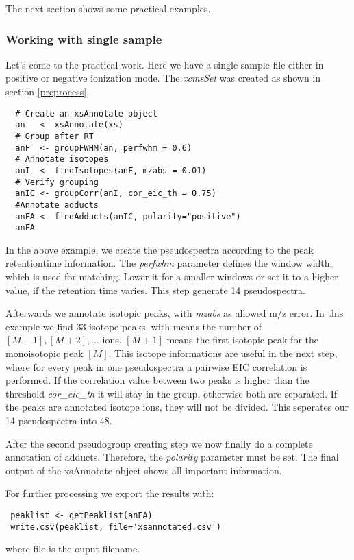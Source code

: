 \documentclass[a4paper,12pt]{article}
\newcommand{\Rclass}[1]{{\textit{#1}}}
\newcommand{\Rfunarg}[1]{{\textit{#1}}}
\begin{document}
The next section shows some practical examples.

\subsubsection{Working with single sample}
Let's come to the practical work. Here we have a single sample file either in
positive or negative ionization mode.
The \Rclass{xcmsSet} was created as shown in section \ref{preprocess}.

\begin{verbatim}
  # Create an xsAnnotate object
  an   <- xsAnnotate(xs)
  # Group after RT
  anF  <- groupFWHM(an, perfwhm = 0.6)
  # Annotate isotopes
  anI  <- findIsotopes(anF, mzabs = 0.01)
  # Verify grouping
  anIC <- groupCorr(anI, cor_eic_th = 0.75)
  #Annotate adducts
  anFA <- findAdducts(anIC, polarity="positive")
  anFA
 \end{verbatim}

In the above example, we create the pseudospectra according to the peak retentiontime
information. The \Rfunarg{perfwhm} parameter defines the window width, which is
used for matching. Lower it for a smaller windows or set it to a higher value,
if the retention time varies. This step generate 14 pseudospectra.

Afterwards we annotate isotopic peaks, with \Rfunarg{mzabs} as allowed m/z
error. In this example we find 33 isotope peaks, with means the number of
$[M+1],[M+2],\ldots$ ions. $[M+1]$ means the first isotopic peak for the monoisotopic
peak $[M]$. This isotope informations are useful in the next step,
where for every peak in one pseudospectra a pairwise EIC correlation is performed. If
the correlation value between two peaks is higher than the threshold
\Rfunarg{cor\_eic\_th} it will stay in the group, otherwise both are separated.
If the peaks are annotated isotope ions, they will not be divided. This seperates
our 14 pseudospectra into 48.

After the second pseudogroup creating step we now finally do a complete
annotation of adducts. Therefore, the \Rfunarg{polarity} parameter must be set.
The final output of the xsAnnotate object shows all important information.

For further processing we export the results with:
\begin{verbatim}
 peaklist <- getPeaklist(anFA)
 write.csv(peaklist, file='xsannotated.csv')
\end{verbatim}
where file is the ouput filename.
\end{document}
